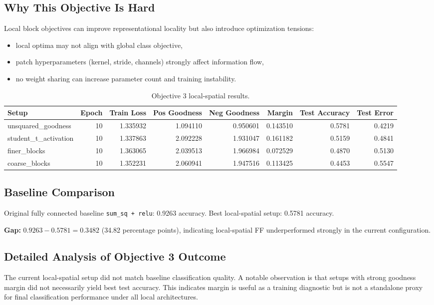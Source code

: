 \documentclass[sigconf]{acmart}
\begin{document}
\subsection{Why This Objective Is Hard}
Local block objectives can improve representational locality but also introduce optimization tensions:
\begin{itemize}
  \item local optima may not align with global class objective,
  \item patch hyperparameters (kernel, stride, channels) strongly affect information flow,
  \item no weight sharing can increase parameter count and training instability.
\end{itemize}

\begin{table}[t]
\caption{Objective 3 local-spatial results.}
\label{tab:obj3}
\centering
\scriptsize
\begin{tabular}{l r r r r r r r}
\toprule
Setup & Epoch & Train Loss & Pos Goodness & Neg Goodness & Margin & Test Accuracy & Test Error \\
\midrule
unsquared\_goodness & 10 & 1.335932 & 1.094110 & 0.950601 & 0.143510 & 0.5781 & 0.4219 \\
student\_t\_activation & 10 & 1.337863 & 2.092228 & 1.931047 & 0.161182 & 0.5159 & 0.4841 \\
finer\_blocks & 10 & 1.363065 & 2.039513 & 1.966984 & 0.072529 & 0.4870 & 0.5130 \\
coarse\_blocks & 10 & 1.352231 & 2.060941 & 1.947516 & 0.113425 & 0.4453 & 0.5547 \\
\bottomrule
\end{tabular}
\end{table}

\subsection{Baseline Comparison}
Original fully connected baseline \texttt{sum\_sq + relu}: 0.9263 accuracy.
Best local-spatial setup: 0.5781 accuracy.

\textbf{Gap:} $0.9263 - 0.5781 = 0.3482$ (34.82 percentage points), indicating local-spatial FF underperformed strongly in the current configuration.

\subsection{Detailed Analysis of Objective 3 Outcome}
The current local-spatial setup did not match baseline classification quality. A notable observation is that setups with strong goodness margin did not necessarily yield best test accuracy. This indicates margin is useful as a training diagnostic but is not a standalone proxy for final classification performance under all local architectures.
\end{document}
